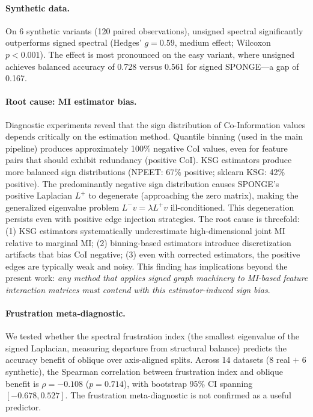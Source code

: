 \documentclass[11pt,letterpaper]{article}
\begin{document}
\paragraph{Synthetic data.} On 6 synthetic variants (120 paired observations), unsigned spectral significantly outperforms signed spectral (Hedges' $g = 0.59$, medium effect; Wilcoxon $p < 0.001$). The effect is most pronounced on the easy variant, where unsigned achieves balanced accuracy of 0.728 versus 0.561 for signed SPONGE---a gap of 0.167.

\paragraph{Root cause: MI estimator bias.} Diagnostic experiments reveal that the sign distribution of Co-Information values depends critically on the estimation method. Quantile binning (used in the main pipeline) produces approximately 100\% negative CoI values, even for feature pairs that should exhibit redundancy (positive CoI). KSG estimators produce more balanced sign distributions (NPEET: 67\% positive; sklearn KSG: 42\% positive). The predominantly negative sign distribution causes SPONGE's positive Laplacian $L^+$ to degenerate (approaching the zero matrix), making the generalized eigenvalue problem $L^- v = \lambda L^+ v$ ill-conditioned. This degeneration persists even with positive edge injection strategies. The root cause is threefold: (1) KSG estimators systematically underestimate high-dimensional joint MI relative to marginal MI; (2) binning-based estimators introduce discretization artifacts that bias CoI negative; (3) even with corrected estimators, the positive edges are typically weak and noisy. This finding has implications beyond the present work: \emph{any method that applies signed graph machinery to MI-based feature interaction matrices must contend with this estimator-induced sign bias}.

\paragraph{Frustration meta-diagnostic.} We tested whether the spectral frustration index (the smallest eigenvalue of the signed Laplacian, measuring departure from structural balance) predicts the accuracy benefit of oblique over axis-aligned splits. Across 14 datasets (8 real $+$ 6 synthetic), the Spearman correlation between frustration index and oblique benefit is $\rho = -0.108$ ($p = 0.714$), with bootstrap 95\% CI spanning $[-0.678, 0.527]$. The frustration meta-diagnostic is not confirmed as a useful predictor.
\end{document}
